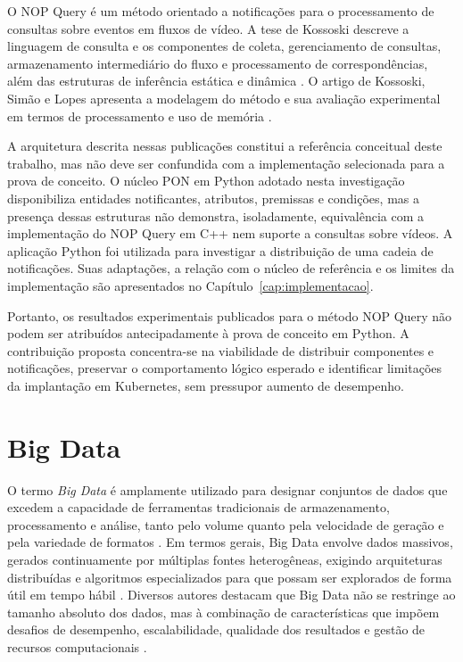 O NOP Query é um método orientado a notificações para o processamento de consultas sobre eventos em fluxos de vídeo. A tese de Kossoski descreve a linguagem de consulta e os componentes de coleta, gerenciamento de consultas, armazenamento intermediário do fluxo e processamento de correspondências, além das estruturas de inferência estática e dinâmica \cite{kossoski2024tese}. O artigo de Kossoski, Simão e Lopes apresenta a modelagem do método e sua avaliação experimental em termos de processamento e uso de memória \cite{kossoski2024applsci}.

A arquitetura descrita nessas publicações constitui a referência conceitual deste trabalho, mas não deve ser confundida com a implementação selecionada para a prova de conceito. O núcleo PON em Python adotado nesta investigação disponibiliza entidades notificantes, atributos, premissas e condições, mas a presença dessas estruturas não demonstra, isoladamente, equivalência com a implementação do NOP Query em C++ nem suporte a consultas sobre vídeos. A aplicação Python foi utilizada para investigar a distribuição de uma cadeia de notificações. Suas adaptações, a relação com o núcleo de referência e os limites da implementação são apresentados no Capítulo~\ref{cap:implementacao}.

Portanto, os resultados experimentais publicados para o método NOP Query não podem ser atribuídos antecipadamente à prova de conceito em Python. A contribuição proposta concentra-se na viabilidade de distribuir componentes e notificações, preservar o comportamento lógico esperado e identificar limitações da implantação em Kubernetes, sem pressupor aumento de desempenho.

\section{Big Data}

O termo \textit{Big Data} é amplamente utilizado para designar conjuntos de dados que excedem a capacidade de ferramentas tradicionais de armazenamento, processamento e análise, tanto pelo volume quanto pela velocidade de geração e pela variedade de formatos \cite{furht2016,ousous2018}. Em termos gerais, Big Data envolve dados massivos, gerados continuamente por múltiplas fontes heterogêneas, exigindo arquiteturas distribuídas e algoritmos especializados para que possam ser explorados de forma útil em tempo hábil \cite{ousous2018,alam2020}. Diversos autores destacam que Big Data não se restringe ao tamanho absoluto dos dados, mas à combinação de características que impõem desafios de desempenho, escalabilidade, qualidade dos resultados e gestão de recursos computacionais \cite{furht2016,ousous2018}.

